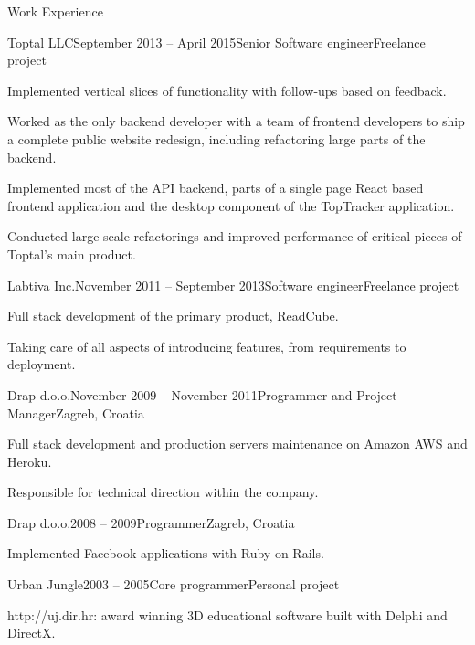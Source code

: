 \documentclass[
	11pt, %
]{resume} %
\begin{document}
\begin{rSection}{Work Experience}
	\begin{rSubsection}{Toptal LLC}{September 2013 -- April 2015}{Senior Software engineer}{Freelance project}
		\item Implemented vertical slices of functionality with follow-ups based on feedback.
		\item Worked as the only backend developer with a team of frontend developers to ship a complete public website redesign, including refactoring large parts of the backend.
		\item Implemented most of the API backend, parts of a single page React based frontend application and the desktop component of the TopTracker application.
		\item Conducted large scale refactorings and improved performance of critical pieces of Toptal's main product.
	\end{rSubsection}

	\begin{rSubsection}{Labtiva Inc.}{November 2011 -- September 2013}{Software engineer}{Freelance project}
		\item Full stack development of the primary product, ReadCube.
		\item Taking care of all aspects of introducing features, from requirements to deployment.
	\end{rSubsection}

	\begin{rSubsection}{Drap d.o.o.}{November 2009 -- November 2011}{Programmer and Project Manager}{Zagreb, Croatia}
		\item Full stack development and production servers maintenance on Amazon AWS and Heroku.
		\item Responsible for technical direction within the company.
	\end{rSubsection}

	\begin{rSubsection}{Drap d.o.o.}{2008 -- 2009}{Programmer}{Zagreb, Croatia}
		\item Implemented Facebook applications with Ruby on Rails.
	\end{rSubsection}

	\begin{rSubsection}{Urban Jungle}{2003 -- 2005}{Core programmer}{Personal project}
		\item http://uj.dir.hr: award winning 3D educational software built with Delphi and DirectX.
	\end{rSubsection}

\end{rSection}
\end{document}
